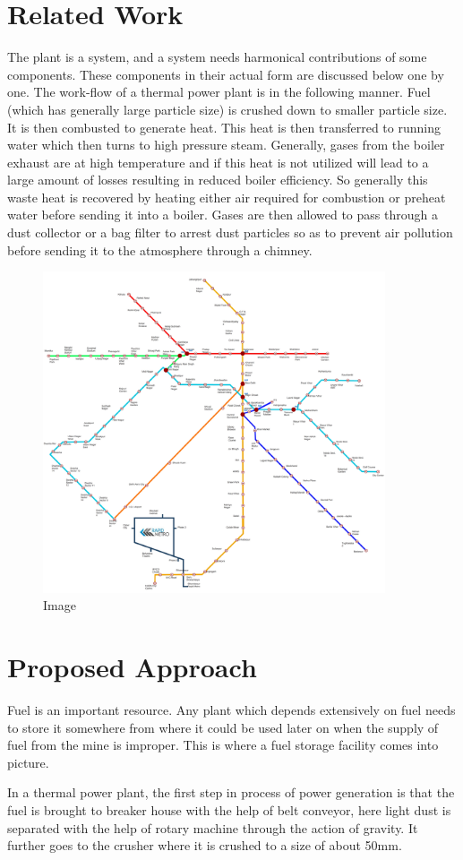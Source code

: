 \documentclass[12pt]{report}
\begin{document}
\section{Related Work}
The plant is a system, and a system needs harmonical contributions of some components. These components in their actual form are discussed below one by one. The work-flow of a thermal power plant is in the following manner. Fuel (which has generally large particle size) is crushed down to smaller particle size. It is then combusted to generate heat. This heat is then transferred to running water which then turns to high pressure steam. Generally, gases from the boiler exhaust are at high temperature and if this heat is not utilized will lead to a large amount of losses resulting in reduced boiler efficiency. So generally this waste heat is recovered by heating either air required for combustion or preheat water before sending it into a boiler. Gases are then allowed to pass through a dust collector or a bag filter to arrest dust particles so as to prevent air pollution before sending it to the atmosphere through a chimney.
\begin{figure}[H]
\centering \includegraphics[width=0.9\textwidth]{images/pic1.jpg}
\caption{Image}
\end{figure}
\section{Proposed Approach}
Fuel is an important resource. Any plant which depends extensively on fuel needs to store it somewhere from where it could be used later on when the supply of fuel from the mine is improper. This is where a fuel storage facility comes into picture. \par In a thermal power plant, the first step in process of power generation is that the fuel is brought to breaker house with the help of belt conveyor, here light dust is separated with the help of rotary machine through the action of gravity. It further goes to the crusher where it is crushed to a size of about 50mm.
\end{document}
